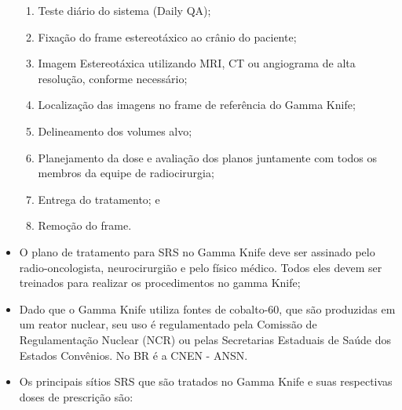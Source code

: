 \documentclass[11pt,a4paper]{article}
\newcounter{exemplo}
\begin{document}
\begin{exemplo}
\begin{itemize}
            \begin{enumerate}
                \item Teste diário do sistema (Daily QA);
                \item Fixação do frame estereotáxico ao crânio do paciente;
                \item Imagem Estereotáxica utilizando MRI, CT ou angiograma de alta resolução, conforme necessário;
                \item Localização das imagens no frame de referência do Gamma Knife;
                \item Delineamento dos volumes alvo;
                \item Planejamento da dose e avaliação dos planos juntamente com todos os membros da equipe de radiocirurgia;
                \item Entrega do tratamento; e
                \item Remoção do frame.
            \end{enumerate}

        \item O plano de tratamento para SRS no Gamma Knife deve ser assinado pelo radio-oncologista, neurocirurgião e pelo físico médico. Todos eles devem ser treinados para realizar os procedimentos no gamma Knife;
        
        \item Dado que o Gamma Knife utiliza fontes de cobalto-60, que são produzidas em um reator nuclear, seu uso é regulamentado pela Comissão de Regulamentação Nuclear (NCR) ou pelas Secretarias Estaduais de Saúde dos Estados Convênios. No BR é a CNEN - ANSN.
        
        \item Os principais sítios SRS que são tratados no Gamma Knife e suas respectivas doses de prescrição são:
        

\end{itemize}
\end{exemplo}
\end{document}
